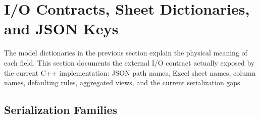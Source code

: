 \section{I/O Contracts, Sheet Dictionaries, and JSON Keys}
\label{sec:io_contracts}

The model dictionaries in the previous section explain the physical meaning of
each field.  This section documents the external I/O contract actually exposed
by the current C++ implementation: JSON path names, Excel sheet names, column
names, defaulting rules, aggregated views, and the current serialization gaps.

\subsection{Serialization Families}

